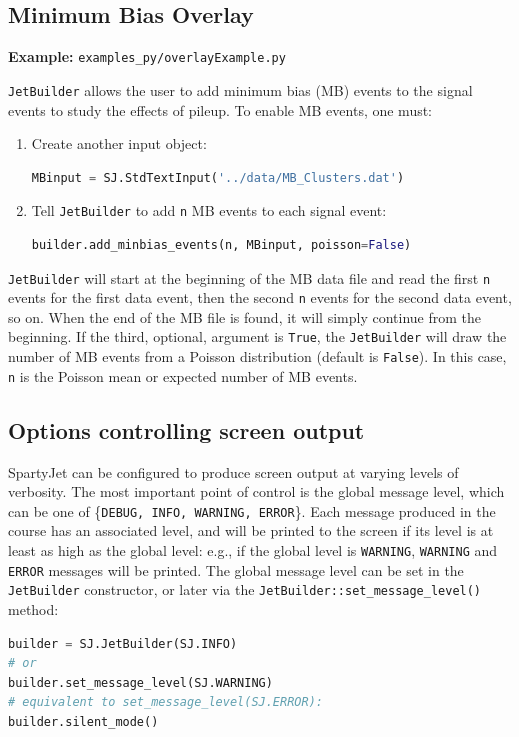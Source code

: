 \documentclass{article}
\newcommand{\prog}[1]{{\sc #1}\xspace}
\newcommand{\code}[1]{{\tt #1}\xspace}
\newcommand{\SJ}[0]{\prog{SpartyJet}}
\begin{document}
\subsection{Minimum Bias Overlay}
{\bf Example:} \verb+examples_py/overlayExample.py+

\code{JetBuilder} allows the user to add minimum bias (MB) events to the signal events to study the effects of pileup.  To enable MB events, one must:
\begin{enumerate}
\item Create another input object:
\begin{lstlisting}[language=Python]
MBinput = SJ.StdTextInput('../data/MB_Clusters.dat')
\end{lstlisting}
\item Tell \code{JetBuilder} to add \code{n} MB events to each signal event:
\begin{lstlisting}[language=Python]
builder.add_minbias_events(n, MBinput, poisson=False)
\end{lstlisting}
\end{enumerate}
\code{JetBuilder} will start at the beginning of the MB data file and read the first \code{n} events for the first data event, then the second \code{n} events for the second data event, so on.  When the end of the MB file is found, it will simply continue from the beginning.   If the third, optional, argument is \verb+True+, the \code{JetBuilder} will draw the number of MB events from a Poisson distribution (default is \verb+False+).  In this case, \code{n} is the Poisson mean or expected number of MB events.

\subsection{Options controlling screen output}

\SJ can be configured to produce screen output at varying levels of verbosity.  The most important point of control is the global message level, which can be one of  \{\code{DEBUG, INFO, WARNING, ERROR}\!\!\}.  Each message produced in the course has an associated level, and will be printed to the screen if its level is at least as high as the global level: e.g., if the global level is \code{WARNING}, \code{WARNING} and \code{ERROR} messages will be printed.  The global message level can be set in the \code{JetBuilder} constructor, or later via the \code{JetBuilder::set\_message\_level()} method:
\begin{lstlisting}[language=Python]
builder = SJ.JetBuilder(SJ.INFO)
# or
builder.set_message_level(SJ.WARNING)
# equivalent to set_message_level(SJ.ERROR):
builder.silent_mode()
\end{lstlisting}
\end{document}
